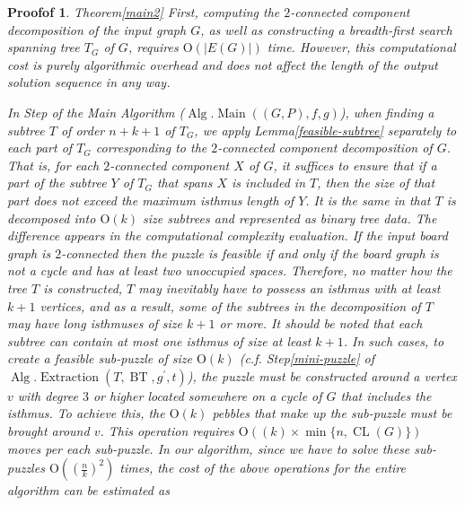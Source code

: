 \documentclass[10pt,a4paper]{amsart}
\newtheorem{Proofof}{Proofof}
\DeclareMathOperator{\Alg}{Alg}
\DeclareMathOperator{\BT}{BT}
\DeclareMathOperator{\CL}{CL}
\DeclareMathOperator{\Extraction}{Extraction}
\DeclareMathOperator{\Main}{Main}
\newcommand{\Ord}{\mathrm{O}}
\newcommand{\maru}[1]{{\ooalign{\hfill$\small#1$\hfill\crcr\scalebox{1.3}{$\bigcirc$}}}}
\newcommand{\tume}{\hspace*{0.2em}}
\begin{document}
\begin{Proofof}{Theorem\tume\ref{main2}}
First, computing the $2$-connected component decomposition of the input graph $G$, as well as 
constructing a breadth-first search spanning tree $T_G$ of $G$, requires 
$\Ord(|E(G)|)$ time. 
However, this computational cost is purely algorithmic overhead and does not affect the length of 
the output solution sequence in any way.

In Step\tume\maru{1} of the Main Algorithm ($\Alg.\Main((G, P), f, g)$), when finding a subtree $T$ 
of order $n + k + 1$ of $T_G$, we apply Lemma\tume\ref{feasible-subtree} separately to each part of $T_G$ 
corresponding to the $2$-connected component decomposition of $G$. 
That is, for each $2$-connected component $X$ of $G$, it suffices to ensure that if a part of the subtree $Y$ 
of $T_G$ that spans $X$ is included in $T$, then the size of that part does not exceed the maximum isthmus 
length of $Y$.
It is the same in that $T$ is decomposed into $\Ord(k)$ size subtrees and represented as binary tree data. 
The difference appears in the computational complexity evaluation. 
If the input board graph is $2$-connected then the puzzle is feasible if and only if the board graph is 
not a cycle and has at least two unoccupied spaces. Therefore, no matter how the tree $T$ is 
constructed, $T$ may inevitably have to possess an isthmus with at least $k+1$ vertices, 
and as a result, some of the subtrees in the decomposition of $T$ may have long isthmuses of size
$k+1$ or more. It should be noted that each subtree can contain at most one isthmus of size 
at least $k+1$. In such cases, to create a feasible sub-puzzle of size $\Ord(k)$
(c.f. Step\tume\ref{mini-puzzle} of $\Alg.\Extraction(T, \BT,g^{\prime},t)$), 
the puzzle must be constructed around a vertex $v$ with degree $3$ or higher located somewhere 
on a cycle of $G$ that includes the isthmus. To achieve this, the $\Ord(k)$ pebbles that make up 
the sub-puzzle must be brought around $v$. This operation requires $\Ord((k)\times \min\{n,\CL(G)\})$
moves per each sub-puzzle.
In our algorithm, since we have to solve these sub-puzzles $\Ord((\frac{n}{k})^2)$ times, 
the cost of the above operations for the entire algorithm can be estimated as 

\end{Proofof}
\end{document}
